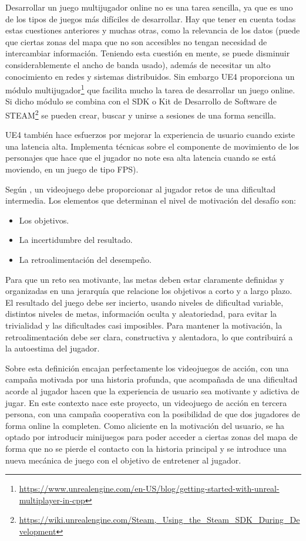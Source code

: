 Desarrollar un juego multijugador online no es una tarea sencilla, ya que es uno de los tipos de juegos más difíciles de desarrollar. Hay que tener en cuenta todas estas cuestiones anteriores y muchas otras, como la relevancia de los datos (puede que ciertas zonas del mapa que no son accesibles no tengan necesidad de intercambiar información. Teniendo esta cuestión en mente, se puede disminuir considerablemente el ancho de banda usado), además de necesitar un alto conocimiento en redes y sistemas distribuidos. Sin embargo \acs{UE4} proporciona un módulo multijugador\footnote{\url{https://www.unrealengine.com/en-US/blog/getting-started-with-unreal-multiplayer-in-cpp}} que facilita mucho la tarea de desarrollar un juego online. Si dicho módulo se combina con el \ac{SDK} o Kit de Desarrollo de Software de STEAM\footnote{\url{https://wiki.unrealengine.com/Steam,_Using_the_Steam_SDK_During_Development}} se pueden crear, buscar y unirse a sesiones de una forma sencilla.

\acs{UE4} también hace esfuerzos por mejorar la experiencia de usuario cuando existe una latencia alta. Implementa técnicas sobre el componente de movimiento de los personajes que hace que el jugador no note esa alta latencia cuando se está moviendo, en un juego de tipo \acs{FPS}).

Según \cite{10}, un videojuego debe proporcionar al jugador retos de una dificultad intermedia. Los elementos que determinan el nivel de motivación del desafío son:

\newpage

\begin{itemize}
\item Los objetivos.
\item La incertidumbre del resultado.
\item La retroalimentación del desempeño.
\end{itemize}

Para que un reto sea motivante, las metas deben estar claramente definidas y organizadas en una jerarquía que relacione los objetivos a corto y a largo plazo. El resultado del juego debe ser incierto, usando niveles de dificultad variable, distintos niveles de metas, información oculta y aleatoriedad, para evitar la trivialidad y las dificultades casi imposibles. Para mantener la motivación, la retroalimentación debe ser clara, constructiva y alentadora, lo que contribuirá a la autoestima del jugador.

Sobre esta definición encajan perfectamente los videojuegos de acción, con una campaña motivada por una historia profunda, que acompañada de una dificultad acorde al jugador hacen que la experiencia de usuario sea motivante y adictiva de jugar. En este contexto nace este proyecto, un videojuego de acción en tercera persona, con una campaña cooperativa con la posibilidad de que dos jugadores de forma online la completen. Como aliciente en la motivación del usuario, se ha optado por introducir minijuegos para poder acceder a ciertas zonas del mapa de forma que no se pierde el contacto con la historia principal y se introduce una nueva mecánica de juego con el objetivo de entretener al jugador. 


